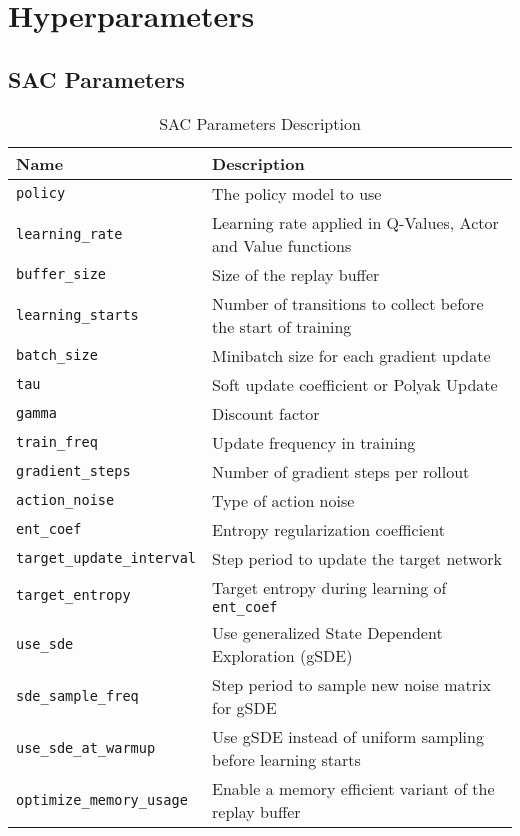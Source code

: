 \chapter{Hyperparameters} \label{appendix1}

\section{\ac{SAC} Parameters}

\begin{table}[H]
	\centering
	\caption{\ac{SAC} Parameters Description}
	\begin{tabularx}{\textwidth}{lX}
		\toprule
		\textbf{Name} & \textbf{Description} \\
		\midrule
		\texttt{policy} & The policy model to use  \\
		\texttt{learning\_rate} & Learning rate applied in Q-Values, Actor and Value functions \\
		\texttt{buffer\_size} & Size of the replay buffer \\
		\texttt{learning\_starts} & Number of transitions to collect before the start of training \\
		\texttt{batch\_size} &  Minibatch size for each gradient update\\
		\texttt{tau} &  Soft update coefficient or Polyak Update \\
		\texttt{gamma} & Discount factor \\
		\texttt{train\_freq} &  Update frequency in training \\
		\texttt{gradient\_steps} & Number of gradient steps per rollout \\
		\texttt{action\_noise} & Type of action noise \\
		\texttt{ent\_coef} & Entropy regularization coefficient \\
		\texttt{target\_update\_interval} &  Step period to update the target network \\
		\texttt{target\_entropy} & Target entropy during learning of \texttt{ent\_coef} \\
		\texttt{use\_sde} &  Use generalized State Dependent Exploration (gSDE) \\
		\texttt{sde\_sample\_freq} & Step period to sample new noise matrix for gSDE \\
		\texttt{use\_sde\_at\_warmup} &  Use gSDE instead of uniform sampling before learning starts \\
		\texttt{optimize\_memory\_usage} & Enable a memory efficient variant of the replay buffer

\end{tabularx}
\end{table}
